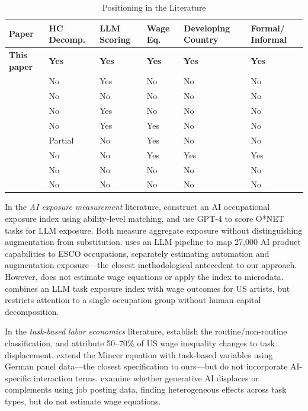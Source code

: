 \documentclass[11pt,a4paper]{article}
\theoremstyle{definition}
\begin{document}
\begin{table}[htbp]
\centering
\caption{Positioning in the Literature}
\label{tab:positioning}
\small
\begin{tabular}{p{3cm}p{1.5cm}p{1.5cm}p{1.5cm}p{1.5cm}p{1.5cm}}
\toprule
Paper & HC Decomp. & LLM Scoring & Wage Eq. & Developing Country & Formal/ Informal \\
\midrule
\textbf{This paper} & \textbf{Yes} & \textbf{Yes} & \textbf{Yes} & \textbf{Yes} & \textbf{Yes} \\[4pt]
\citet{eloundou2024gpts} & No & Yes & No & No & No \\
\citet{felten2021occupational} & No & No & No & No & No \\
\citet{demirev2026ai} & No & Yes & No & No & No \\
\citet{makridis2026labor} & No & Yes & Yes & No & No \\
\citet{walter2022susceptible} & Partial & No & Yes & No & No \\
\citet{mina2025automation} & No & No & Yes & Yes & Yes \\
\citet{acemoglu2024simple} & No & No & No & No & No \\
\citet{growiec2024hardware} & No & No & No & No & No \\
\bottomrule
\end{tabular}
\end{table}

In the \textit{AI exposure measurement} literature, \citet{felten2021occupational} construct an AI occupational exposure index using ability-level matching, and \citet{eloundou2024gpts} use GPT-4 to score O*NET tasks for LLM exposure. Both measure aggregate exposure without distinguishing augmentation from substitution. \citet{demirev2026ai} uses an LLM pipeline to map 27,000 AI product capabilities to ESCO occupations, separately estimating automation and augmentation exposure---the closest methodological antecedent to our approach. However, \citeauthor{demirev2026ai} does not estimate wage equations or apply the index to microdata. \citet{makridis2026labor} combines an LLM task exposure index with wage outcomes for US artists, but restricts attention to a single occupation group without human capital decomposition.

In the \textit{task-based labor economics} literature, \citet{autor2003skill} establish the routine/non-routine classification, and \citet{acemoglu2022tasks} attribute 50--70\% of US wage inequality changes to task displacement. \citet{walter2022susceptible} extend the Mincer equation with task-based variables using German panel data---the closest specification to ours---but do not incorporate AI-specific interaction terms. \citet{chen2025displacement} examine whether generative AI displaces or complements using job posting data, finding heterogeneous effects across task types, but do not estimate wage equations.
\end{document}
